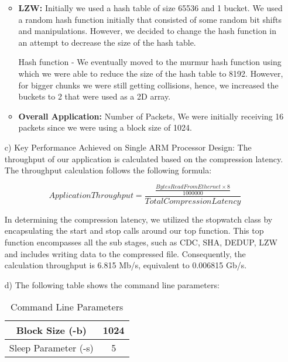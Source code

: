 \documentclass[../main.tex]{subfiles}
\begin{document}
\begin{enumerate}
\begin{itemize}
        \item \textbf{LZW:} Initially we used a hash table of size 65536 and 1 bucket. We used a random hash function initially that consisted of some random bit shifts and manipulations. However, we decided to change the hash function in an attempt to decrease the size of the hash table. 

        Hash function - We eventually moved to the murmur hash function using which we were able to reduce the size of the hash table to 8192. However, for bigger chunks we were still getting collisions, hence, we increased the buckets to 2 that were used as a 2D array.

        \item \textbf{Overall Application:} Number of Packets, We were initially receiving 16 packets since we were using a block size of 1024.
 
        \end{itemize} 

        \item[c)] Key Performance Achieved on Single ARM Processor Design:
        The throughput of our application is calculated based on the compression latency. The throughput calculation follows the following formula: 

        $$
        ApplicationThroughput = \frac{\frac{BytesReadFromEthernet \times 8}{1000000}}{TotalCompressionLatency}
        $$

        In determining the compression latency, we utilized the stopwatch class by encapsulating the start and stop calls around our top function. This top function encompasses all the sub stages, such as CDC, SHA, DEDUP, LZW and includes writing data to the compressed file. Consequently, the calculation throughput is 6.815 Mb/s, equivalent to 0.006815 Gb/s.

        \item[d)] The following table shows the command line parameters:
            
            \begin{table}[H]
                \centering
                \begin{tabular}{|c|c|} \hline 
                     Block Size (-b)& 1024\\ \hline 
                     Sleep Parameter (-s)& 5\\ \hline
                \end{tabular}
                \caption{Command Line Parameters}
                \label{tab:command_line_params}
            \end{table}


\end{enumerate}
\end{document}
